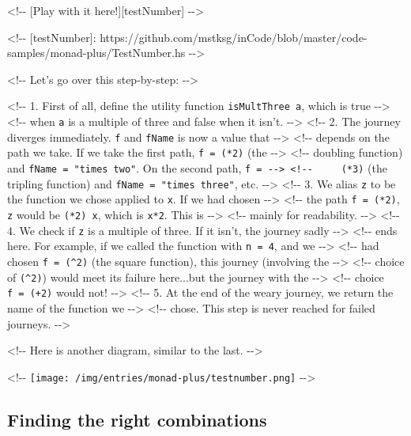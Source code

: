 \documentclass[]{article}
\begin{document}
\textless{}!-\/- {[}Play with it here!{]}{[}testNumber{]} -\/-\textgreater{}

\textless{}!-\/- {[}testNumber{]}:
https://github.com/mstksg/inCode/blob/master/code-samples/monad-plus/TestNumber.hs
-\/-\textgreater{}

\textless{}!-\/- Let's go over this step-by-step: -\/-\textgreater{}

\textless{}!-\/- 1. First of all, define the utility function
\texttt{isMultThree\ a}, which is true -\/-\textgreater{} \textless{}!-\/- when
\texttt{a} is a multiple of three and false when it isn't. -\/-\textgreater{}
\textless{}!-\/- 2. The journey diverges immediately. \texttt{f} and
\texttt{fName} is now a value that -\/-\textgreater{} \textless{}!-\/- depends
on the path we take. If we take the first path, \texttt{f\ =\ (*2)} (the
-\/-\textgreater{} \textless{}!-\/- doubling function) and
\texttt{fName\ =\ "times\ two"}. On the second path,
\texttt{f\ =\ -\/-\textgreater{}\ \textless{}!-\/-\ \ \ \ \ (*3)} (the tripling
function) and \texttt{fName\ =\ "times\ three"}, etc. -\/-\textgreater{}
\textless{}!-\/- 3. We alias \texttt{z} to be the function we chose applied to
\texttt{x}. If we had chosen -\/-\textgreater{} \textless{}!-\/- the path
\texttt{f\ =\ (*2)}, \texttt{z} would be \texttt{(*2)\ x}, which is
\texttt{x*2}. This is -\/-\textgreater{} \textless{}!-\/- mainly for
readability. -\/-\textgreater{} \textless{}!-\/- 4. We check if \texttt{z} is a
multiple of three. If it isn't, the journey sadly -\/-\textgreater{}
\textless{}!-\/- ends here. For example, if we called the function with
\texttt{n\ =\ 4}, and we -\/-\textgreater{} \textless{}!-\/- had chosen
\texttt{f\ =\ (\^{}2)} (the square function), this journey (involving the
-\/-\textgreater{} \textless{}!-\/- choice of \texttt{(\^{}2)}) would meet its
failure here...but the journey with the -\/-\textgreater{} \textless{}!-\/-
choice \texttt{f\ =\ (+2)} would not! -\/-\textgreater{} \textless{}!-\/- 5. At
the end of the weary journey, we return the name of the function we
-\/-\textgreater{} \textless{}!-\/- chose. This step is never reached for failed
journeys. -\/-\textgreater{}

\textless{}!-\/- Here is another diagram, similar to the last.
-\/-\textgreater{}

\textless{}!-\/- \texttt{[image: /img/entries/monad-plus/testnumber.png]}
-\/-\textgreater{}

\subsection{Finding the right combinations}
\end{document}
